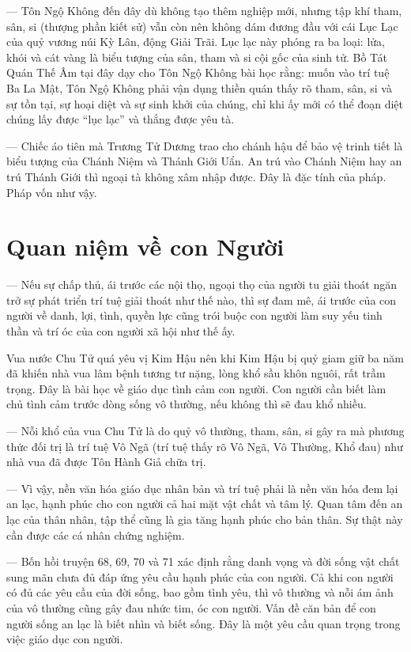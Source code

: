 — Tôn Ngộ Không đến đây dù không tạo thêm nghiệp mới, nhưng tập khí tham, sân, si (thượng phần kiết sử) vẫn còn nên không dám đương đầu với cái Lục Lạc của quỷ vương núi Kỳ Lân, động Giải Trãi. Lục lạc này phóng ra ba loại: lửa, khói và cát vàng là biểu tượng của sân, tham và si cội gốc của sinh tử. Bồ Tát Quán Thế Âm tại đây dạy cho Tôn Ngộ Không bài học rằng: muốn vào trí tuệ Ba La Mật, Tôn Ngộ Không phải vận dụng thiền quán thấy rõ tham, sân, si và sự tồn tại, sự hoại diệt và sự sinh khởi của chúng, chỉ khi ấy mới có thể đoạn diệt chúng lấy được ``lục lạc'' và thắng được yêu tà.

— Chiếc áo tiên mà Trương Tử Dương trao cho chánh hậu để bảo vệ trinh tiết là biểu tượng của Chánh Niệm và Thánh Giới Uẩn. An trú vào Chánh Niệm hay an trú Thánh Giới thì ngoại tà không xâm nhập được. Đây là đặc tính của pháp. Pháp vốn như vậy.

\section{Quan niệm về con Người} %
\label{sec:68_69_con_nguoi}

— Nếu sự chấp thủ, ái trước các nội thọ, ngoại thọ của người tu giải thoát ngăn trở sự phát triển trí tuệ giải thoát như thế nào, thì sự đam mê, ái trước của con người về danh, lợi, tình, quyền lực cũng trói buộc con người làm suy yếu tinh thần và trí óc của con người xã hội như thế ấy.

Vua nước Chu Tử quá yêu vị Kim Hậu nên khi Kim Hậu bị quỷ giam giữ ba năm đã khiến nhà vua lâm bệnh tương tư nặng, lòng khổ sầu khôn nguôi, rất trầm trọng. Đây là bài học về giáo dục tình cảm con người. Con người cần biết làm chủ tình cảm trước dòng sống vô thường, nếu không thì sẽ đau khổ nhiều.

— Nỗi khổ của vua Chu Tử là do quỷ vô thường, tham, sân, si gây ra mà phương thức đối trị là trí tuệ Vô Ngã (trí tuệ thấy rõ Vô Ngã, Vô Thường, Khổ đau) như nhà vua đã được Tôn Hành Giả chữa trị.

— Vì vậy, nền văn hóa giáo dục nhân bản và trí tuệ phải là nền văn hóa đem lại an lạc, hạnh phúc cho con người cả hai mặt vật chất và tâm lý. Quan tâm đến an lạc của thân nhân, tập thể cũng là gia tăng hạnh phúc cho bản thân. Sự thật này cần được các cá nhân chứng nghiệm.

— Bốn hồi truyện 68, 69, 70 và 71 xác định rằng danh vọng và đời sống vật chất sung mãn chưa đủ đáp ứng yêu cầu hạnh phúc của con người. Cả khi con người có đủ các yêu cầu của đời sống, bao gồm tình yêu, thì vô thường và nỗi ám ảnh của vô thường cũng gây đau nhức tim, óc con người. Vấn đề căn bản để con người sống an lạc là biết nhìn và biết sống. Đây là một yêu cầu quan trọng trong việc giáo dục con người.

